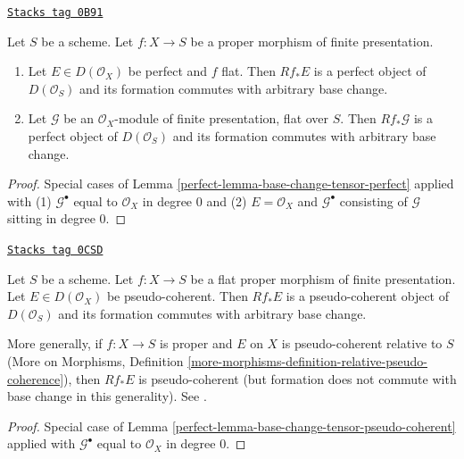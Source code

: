 \begin{lemma}
\label{perfect-lemma-flat-proper-perfect-direct-image-general}
\href{https://stacks.math.columbia.edu/tag/0B91}{\texttt{Stacks tag 0B91}}

Let $S$ be a scheme. Let $f : X \to S$ be a proper
morphism of finite presentation.
\begin{enumerate}
\item Let $E \in D(\mathcal{O}_X)$ be perfect and $f$ flat. Then
$Rf_*E$ is a perfect object of $D(\mathcal{O}_S)$ and its formation
commutes with arbitrary base change.
\item Let $\mathcal{G}$ be an $\mathcal{O}_X$-module of finite presentation,
flat over $S$. Then $Rf_*\mathcal{G}$ is a perfect object of
$D(\mathcal{O}_S)$ and its formation commutes with arbitrary base change.
\end{enumerate}
\end{lemma}

\begin{proof}

Special cases of
Lemma \ref{perfect-lemma-base-change-tensor-perfect} applied with
(1) $\mathcal{G}^\bullet$ equal to $\mathcal{O}_X$ in degree $0$
and (2) $E = \mathcal{O}_X$ and $\mathcal{G}^\bullet$ consisting
of $\mathcal{G}$ sitting in degree $0$.
\end{proof}

\begin{lemma}
\label{perfect-lemma-flat-proper-pseudo-coherent-direct-image-general}
\href{https://stacks.math.columbia.edu/tag/0CSD}{\texttt{Stacks tag 0CSD}}

Let $S$ be a scheme. Let $f : X \to S$ be a flat proper
morphism of finite presentation. Let $E \in D(\mathcal{O}_X)$
be pseudo-coherent. Then $Rf_*E$ is a pseudo-coherent object of
$D(\mathcal{O}_S)$ and its formation commutes with arbitrary base change.
\end{lemma}

More generally, if $f : X \to S$ is proper and $E$ on $X$ is pseudo-coherent
relative to $S$ (More on Morphisms, Definition
\ref{more-morphisms-definition-relative-pseudo-coherence}),
then $Rf_*E$ is pseudo-coherent
(but formation does not commute with base change in this generality).
See \cite{Kiehl}.

\begin{proof}

Special case of
Lemma \ref{perfect-lemma-base-change-tensor-pseudo-coherent} applied with
$\mathcal{G}^\bullet$ equal to $\mathcal{O}_X$ in degree $0$.
\end{proof}

